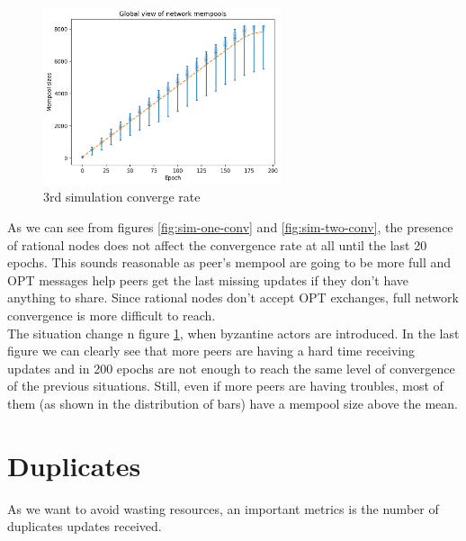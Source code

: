 \documentclass[mscthesis]{usiinfthesis}
\begin{document}
\begin{figure}[H]
  \centering
  \includegraphics[width=7cm]{images/3/3-convergence.png}
  \caption{3rd simulation converge rate}
  \label{fig:sim-three-conv}
\end{figure}


As we can see from figures \ref{fig:sim-one-conv} and \ref{fig:sim-two-conv}, the presence of rational nodes does not affect the convergence rate at all until the last 20 epochs. This sounds reasonable as peer's mempool are going to be more full and OPT messages help peers get the last missing updates if they don't have anything to share. Since rational nodes don't accept OPT exchanges, full network convergence is more difficult to reach. \\
The situation change n figure \ref{fig:sim-three-conv}, when byzantine actors are introduced. In the last figure we can clearly see that more peers are having a hard time receiving updates and in 200 epochs are not enough to reach the same level of convergence of the previous situations. Still, even if more peers are having troubles, most of them (as shown in the distribution of bars) have a mempool size above the mean. 
\section{Duplicates}
As we want to avoid wasting resources, an important metrics is the number of duplicates updates received.
\end{document}
